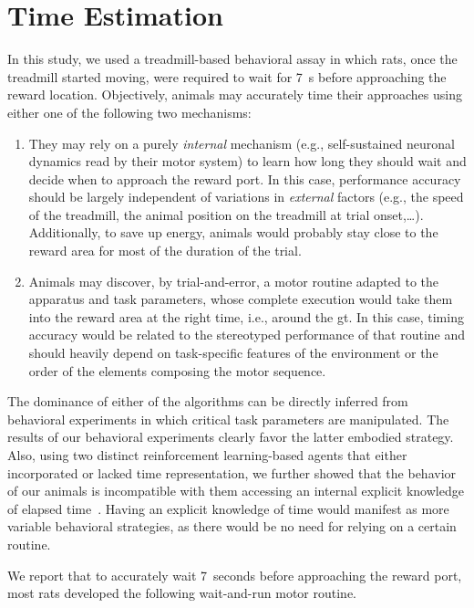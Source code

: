 \section{Time Estimation}
\label{ch:disscusion:time}

In this study, we used a treadmill-based behavioral assay in which rats, once the treadmill started moving, were required to wait for 7~s before approaching the reward location.
Objectively, animals may accurately time their approaches using either one of the following two mechanisms:
\begin{enumerate}[noitemsep, label=\Roman*.]
    \item They may rely on a purely \textit{internal} mechanism (e.g., self-sustained neuronal dynamics read by their motor system) to learn how long they should wait and decide when to approach the reward port.
    In this case, performance accuracy should be largely independent of variations in \textit{external} factors (e.g., the speed of the treadmill, the animal position on the treadmill at trial onset,\ldots).
    Additionally, to save up energy, animals would probably stay close to the reward area for most of the duration of the trial.
    \item Animals may discover, by trial-and-error, a motor routine adapted to the apparatus and task parameters, whose complete execution would take them into the reward area at the right time, i.e., around the \gls{gt}.
    In this case, timing accuracy would be related to the stereotyped performance of that routine and should heavily depend on task-specific features of the environment or the order of the elements composing the motor sequence.
\end{enumerate}
The dominance of either of the algorithms can be directly inferred from behavioral experiments in which critical task parameters are manipulated.
The results of our behavioral experiments clearly favor the latter embodied strategy.
Also, using two distinct reinforcement learning-based agents that either incorporated or lacked time representation, we further showed that the behavior of our animals is incompatible with them accessing an internal explicit knowledge of elapsed time~\cite{Safaie2020PNAS}.
Having an explicit knowledge of time would manifest as more variable behavioral strategies, as there would be no need for relying on a certain routine.
\par
We report that to accurately wait 7~seconds before approaching the reward port, most rats developed the following wait-and-run motor routine.
